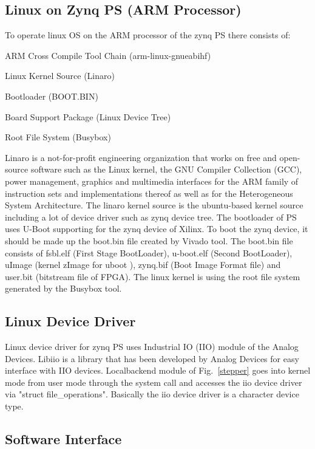 \documentclass[a4paper,
              ]{jacow}
\begin{document}
\subsection{Linux on Zynq PS (ARM Processor)}
To operate linux OS on the ARM processor of the zynq PS there consists of:
\begin{Itemize}
	\item ARM Cross Compile Tool Chain (arm-linux-gnueabihf)
	\item Linux Kernel Source (Linaro)
	\item Bootloader (BOOT.BIN)
	\item Board Support Package (Linux Device Tree)
	\item Root File System (Busybox)
\end{Itemize}

Linaro\cite{linaro} is a not-for-profit engineering organization that works on free and open-source software such as the Linux kernel, the GNU Compiler Collection (GCC), power management, graphics and multimedia interfaces for the ARM family of instruction sets and implementations thereof as well as for the Heterogeneous System Architecture.  
The linaro kernel source is the ubuntu-based kernel source including a lot of device driver such as zynq device tree.
The bootloader of PS uses U-Boot\cite{u-boot} supporting for the zynq device of Xilinx. To boot the zynq device, it should be made up the boot.bin file created by Vivado\cite{vivado} tool. The boot.bin\cite{boot-bin} file consists of fsbl.elf (First Stage BootLoader), u-boot.elf (Second BootLoader), uImage (kernel zImage for uboot ), zynq.bif (Boot Image Format file) and user.bit (bitstream file of FPGA). The linux kernel is using the root file system generated by the Busybox\cite{busybox} tool.

\subsection{Linux Device Driver}
Linux device driver for zynq PS uses Industrial IO (IIO) module of the Analog Devices. Libiio\cite{iio} is a library that has been developed by Analog Devices for easy interface with IIO devices. Localbackend module of Fig.~\ref{stepper} goes into kernel mode from user mode through the system call and accesses the iio device driver via "struct file\_operations". Basically the iio device driver is a character device type.

\subsection{Software Interface}
\end{document}
